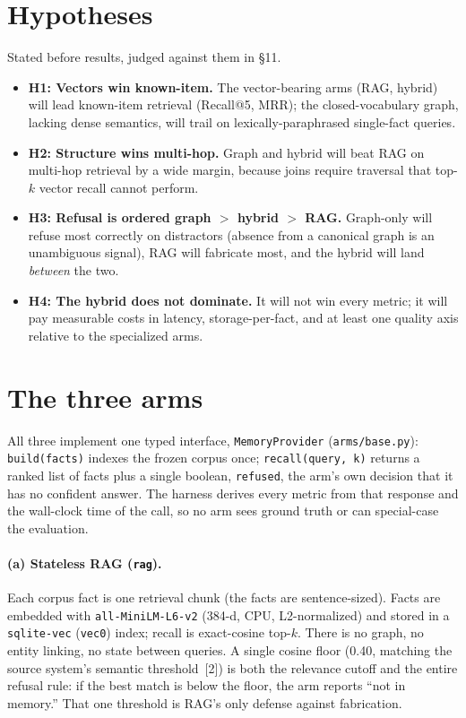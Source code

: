 \documentclass[11pt]{article}
\newcommand{\arm}[1]{\texttt{#1}}
\begin{document}
\section{Hypotheses}
Stated before results, judged against them in \S11.
\begin{itemize}
  \item \textbf{H1: Vectors win known-item.} The vector-bearing arms (RAG, hybrid) will
  lead known-item retrieval (Recall@5, MRR); the closed-vocabulary graph, lacking dense
  semantics, will trail on lexically-paraphrased single-fact queries.
  \item \textbf{H2: Structure wins multi-hop.} Graph and hybrid will beat RAG on
  multi-hop retrieval by a wide margin, because joins require traversal that top-$k$ vector
  recall cannot perform.
  \item \textbf{H3: Refusal is ordered graph $>$ hybrid $>$ RAG.} Graph-only will refuse
  most correctly on distractors (absence from a canonical graph is an unambiguous signal),
  RAG will fabricate most, and the hybrid will land \emph{between} the two.
  \item \textbf{H4: The hybrid does not dominate.} It will not win every metric; it will
  pay measurable costs in latency, storage-per-fact, and at least one quality axis relative
  to the specialized arms.
\end{itemize}

\section{The three arms}
All three implement one typed interface, \texttt{MemoryProvider} (\texttt{arms/base.py}):
\texttt{build(facts)} indexes the frozen corpus once; \texttt{recall(query, k)} returns a
ranked list of facts plus a single boolean, \texttt{refused}, the arm's own decision that it
has no confident answer. The harness derives every metric from that response and the
wall-clock time of the call, so no arm sees ground truth or can special-case the evaluation.

\paragraph{(a) Stateless RAG (\arm{rag}).} Each corpus fact is one retrieval chunk (the
facts are sentence-sized). Facts are embedded with \texttt{all-MiniLM-L6-v2} (384-d, CPU,
L2-normalized) and stored in a \texttt{sqlite-vec} (\texttt{vec0}) index; recall is
exact-cosine top-$k$. There is no graph, no entity linking, no state between queries. A
single cosine floor (0.40, matching the source system's semantic threshold~[2]) is both the
relevance cutoff and the entire refusal rule: if the best match is below the floor, the arm
reports ``not in memory.'' That one threshold is RAG's only defense against fabrication.
\end{document}
